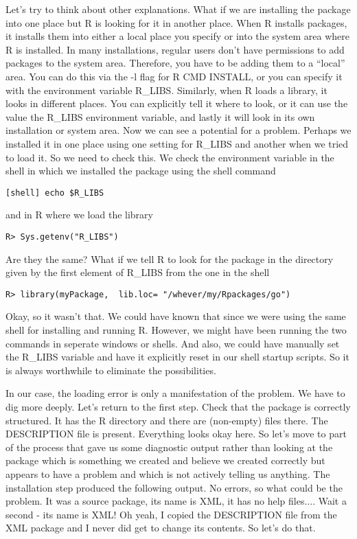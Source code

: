 Let's try to think about other explanations.  What if we are
installing the package into one place but R is looking for it in
another place.  When R installs packages, it installs them into either
a local place you specify or into the system area where R is
installed.  In many installations, regular users don't have
permissions to add packages to the system area.  Therefore, you have
to be adding them to a ``local'' area.  You can do this via the -l
flag for R CMD INSTALL, or you can specify it with the environment
variable R_LIBS.  Similarly, when R loads a library, it looks in
different places.  You can explicitly tell it where to look, or it can
use the value the R_LIBS environment variable, and lastly it will look
in its own installation or system area.
Now we can see a potential for a problem. Perhaps we installed
it in one place using one setting for  R_LIBS
and another when we tried to load it.
So we need to check this.
We check the environment variable in the shell
in which we installed the package using the
shell command
\begin{verbatim}
[shell] echo $R_LIBS
\end{verbatim}
and in R where we load the library
\begin{verbatim}
R> Sys.getenv("R_LIBS")
\end{verbatim}
Are they the same?
What if we tell R to look for the package in
the directory given by the first element of
R_LIBS from the one in the shell
\begin{verbatim}
R> library(myPackage,  lib.loc= "/whever/my/Rpackages/go")
\end{verbatim}
Okay, so it wasn't that. We could have known that 
since we were using the same shell
for installing and running R.
However, we might have been running the two commands in seperate
windows or shells.
And also, we could have manually set the R_LIBS variable
and have it explicitly reset in our shell startup scripts.
So it is always worthwhile to eliminate the possibilities.


In our case, the loading error is only a manifestation of the problem.
We have to dig more deeply.  Let's return to the first step.  Check
that the package is correctly structured.  It has the R directory and
there are (non-empty) files there.  The DESCRIPTION file is present.
Everything looks okay here.  So let's move to part of the process that
gave us some diagnostic output rather than looking at the package
which is something we created and believe we created correctly but
appears to have a problem and which is not actively telling us
anything.  The installation step produced the following output.  No
errors, so what could be the problem.  It was a source package, its
name is XML, it has no help files....  Wait a second - its name is
XML!  Oh yeah, I copied the DESCRIPTION file from the XML package and
I never did get to change its contents.
So let's do that. 

